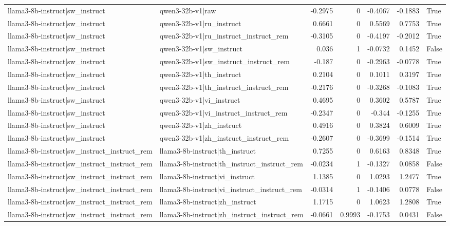 \begin{table}
\begin{tabular}{l l r r r r l}
llama3-8b-instruct|sw_instruct & qwen3-32b-v1|raw & -0.2975 & 0 & -0.4067 & -0.1883 & True \\
llama3-8b-instruct|sw_instruct & qwen3-32b-v1|ru_instruct & 0.6661 & 0 & 0.5569 & 0.7753 & True \\
llama3-8b-instruct|sw_instruct & qwen3-32b-v1|ru_instruct_instruct_rem & -0.3105 & 0 & -0.4197 & -0.2012 & True \\
llama3-8b-instruct|sw_instruct & qwen3-32b-v1|sw_instruct & 0.036 & 1 & -0.0732 & 0.1452 & False \\
llama3-8b-instruct|sw_instruct & qwen3-32b-v1|sw_instruct_instruct_rem & -0.187 & 0 & -0.2963 & -0.0778 & True \\
llama3-8b-instruct|sw_instruct & qwen3-32b-v1|th_instruct & 0.2104 & 0 & 0.1011 & 0.3197 & True \\
llama3-8b-instruct|sw_instruct & qwen3-32b-v1|th_instruct_instruct_rem & -0.2176 & 0 & -0.3268 & -0.1083 & True \\
llama3-8b-instruct|sw_instruct & qwen3-32b-v1|vi_instruct & 0.4695 & 0 & 0.3602 & 0.5787 & True \\
llama3-8b-instruct|sw_instruct & qwen3-32b-v1|vi_instruct_instruct_rem & -0.2347 & 0 & -0.344 & -0.1255 & True \\
llama3-8b-instruct|sw_instruct & qwen3-32b-v1|zh_instruct & 0.4916 & 0 & 0.3824 & 0.6009 & True \\
llama3-8b-instruct|sw_instruct & qwen3-32b-v1|zh_instruct_instruct_rem & -0.2607 & 0 & -0.3699 & -0.1514 & True \\
llama3-8b-instruct|sw_instruct_instruct_rem & llama3-8b-instruct|th_instruct & 0.7255 & 0 & 0.6163 & 0.8348 & True \\
llama3-8b-instruct|sw_instruct_instruct_rem & llama3-8b-instruct|th_instruct_instruct_rem & -0.0234 & 1 & -0.1327 & 0.0858 & False \\
llama3-8b-instruct|sw_instruct_instruct_rem & llama3-8b-instruct|vi_instruct & 1.1385 & 0 & 1.0293 & 1.2477 & True \\
llama3-8b-instruct|sw_instruct_instruct_rem & llama3-8b-instruct|vi_instruct_instruct_rem & -0.0314 & 1 & -0.1406 & 0.0778 & False \\
llama3-8b-instruct|sw_instruct_instruct_rem & llama3-8b-instruct|zh_instruct & 1.1715 & 0 & 1.0623 & 1.2808 & True \\
llama3-8b-instruct|sw_instruct_instruct_rem & llama3-8b-instruct|zh_instruct_instruct_rem & -0.0661 & 0.9993 & -0.1753 & 0.0431 & False \\

\end{tabular}
\end{table}
